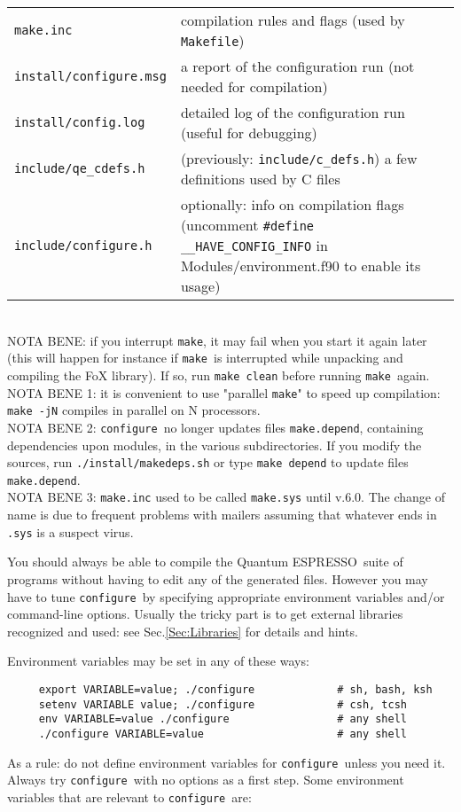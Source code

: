 \documentclass[12pt,a4paper]{article}
\def\qe{{\sc Quantum ESPRESSO}}
\def\configure{\texttt{configure}}
\def\make{\texttt{make}}
\begin{document}
\begin{tabular}{ll}
\texttt{make.inc} &      compilation rules and flags (used by \texttt{Makefile})\\
\texttt{install/configure.msg} & a report of the configuration run (not needed for compilation)\\
\texttt{install/config.log} & detailed log of the configuration run (useful for debugging)\\
	\texttt{include/qe\_cdefs.h} &  (previously: \texttt{include/c\_defs.h})
	a few definitions used by C files\\
\texttt{include/configure.h} &  optionally: info on compilation flags
	(uncomment \verb|#define __HAVE_CONFIG_INFO| 
	 in Modules/environment.f90 to enable its usage)\\
\end{tabular}\\
NOTA BENE: if you interrupt \make, it may fail when you start it again 
later (this will happen for instance if \make\ is interrupted while unpacking
and compiling the FoX library). If so, run \texttt{make clean} before
running \make\ again.\\
NOTA BENE 1: it is convenient to use "parallel \make" to speed up compilation:
\texttt{make -jN} compiles in parallel on N processors.\\
NOTA BENE 2: \configure\ no longer updates files \texttt{make.depend},
containing dependencies upon modules, in the various subdirectories.
If you modify the sources, run \texttt{./install/makedeps.sh} or type
\texttt{make depend} to update files \texttt{make.depend}.\\
NOTA BENE 3: \texttt{make.inc} used to be called \texttt{make.sys}
until v.6.0. The change of name is due to frequent problems with mailers
assuming that whatever ends in \texttt{.sys} is a suspect virus.

You should always be able to compile the \qe\ suite
of programs without having to edit any of the generated files. However you
may have to tune \configure\ by specifying appropriate environment variables
and/or command-line options. Usually the tricky part is to get external
libraries recognized and used: see Sec.\ref{Sec:Libraries}
for details and hints.

Environment variables may be set in any of these ways:
\begin{verbatim}
     export VARIABLE=value; ./configure             # sh, bash, ksh
     setenv VARIABLE value; ./configure             # csh, tcsh
     env VARIABLE=value ./configure                 # any shell
     ./configure VARIABLE=value                     # any shell
\end{verbatim}
As a rule: do not define environment variables for \configure\ unless
you need it. Always try \configure\ with no options as a first step.
Some environment variables that are relevant to \configure\ are:
\end{document}
